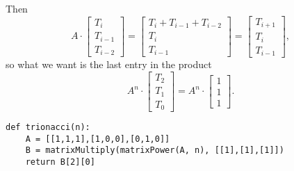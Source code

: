 \documentclass[11pt]{article}
\begin{document}
Then 
$$ A \cdot
\left[\begin{array}{c}T_i\\T_{i-1}\\T_{i-2}\end{array}\right] =
\left[\begin{array}{c}T_i+T_{i-1}+T_{i-2}\\T_{i}\\T_{i-1}\end{array}\right] =
\left[\begin{array}{c}T_{i+1}\\T_{i}\\T_{i-1}\end{array}\right], $$
so what we want is the last entry in the product
$$ A^n \cdot
\left[\begin{array}{c}T_2\\T_1\\T_0\end{array}\right] = A^n
\cdot \left[\begin{array}{c}1\\1\\1\end{array}\right] .$$

\begin{verbatim}
def trionacci(n):
    A = [[1,1,1],[1,0,0],[0,1,0]]
    B = matrixMultiply(matrixPower(A, n), [[1],[1],[1]])
    return B[2][0]
\end{verbatim}
\end{document}
